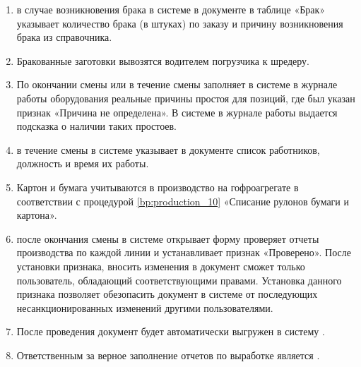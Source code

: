 \begin{enumerate}
 Таблица «Журнал работы оборудования» заполняется \gaoperator путем нажатия кнопок <<Контроль переналадки>>, <<Контроль паузы>>, <<Контроль простоя>>.
\item	\gaoperator в случае возникновения брака  в системе \gofro в документе  в таблице «Брак» указывает количество брака (в штуках) по заказу и причину возникновения брака из справочника.
\item Бракованные заготовки вывозятся водителем погрузчика к шредеру.



\item 	 По окончании смены или в течение смены \gaoperator заполняет в системе \gofro  в журнале работы оборудования реальные причины простоя для позиций, где был указан признак «Причина не определена». В системе \gofro  в журнале работы выдается подсказка о наличии таких простоев.
\item 	\gaoperator в течение смены в системе \gofro  указывает в документе  список работников, должность и время их работы.
\item	Картон и бумага учитываются в производство на гофроагрегате в соответствии с процедурой \ref{bp:production_10} «Списание рулонов бумаги и картона».
\item	\master  после окончания смены в системе \gofro  открывает форму 
\master проверяет отчеты производства по каждой линии и устанавливает признак «Проверено». После установки признака, вносить изменения в документ сможет только пользователь, обладающий соответствующими правами. Установка данного признака позволяет обезопасить документ в системе \gofro от последующих несанкционированных изменений другими пользователями.
\item	После проведения документ  будет автоматически выгружен в систему \erp.
\item Ответственным за верное заполнение отчетов по выработке является \master.





\end{enumerate}
